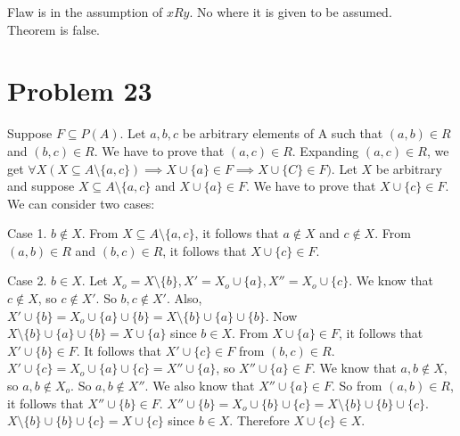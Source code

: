 \documentclass{article}
\begin{document}
Flaw is in the assumption of $xRy$. No where it is given to be
assumed. \\

Theorem is false.

\section{Problem 23}
Suppose $F \subseteq P(A)$. Let $a,b,c$ be arbitrary elements of A
such that $(a,b) \in R$ and $(b,c) \in R$. We have to prove that
$(a,c) \in R$. Expanding $(a,c) \in R$, we get $\forall X(X \subseteq
A \setminus \{a,c\}) \implies X \cup \{a\} \in F \implies X \cup \{C\}
\in F)$. Let $X$ be arbitrary and suppose $X \subseteq A \setminus
\{a,c\}$ and $X \cup \{a\} \in F$. We have to prove that $X \cup \{c\}
\in F$. We can consider two cases:

Case 1. $b \notin X$. From $X \subseteq A \setminus \{a,c\}$, it
follows that $a \notin X$ and $c \notin X$. From $(a,b) \in R$ and
$(b,c) \in R$, it follows that $X \cup \{c\} \in F$.

Case 2. $b \in X$. Let $X_o = X \setminus \{b\}, X' = X_o \cup \{a\},
X'' = X_o \cup \{c\}$. We know that $c \notin X$, so $c \notin X'$. So
$b,c \notin X'$. Also, $X' \cup \{b\} = X_o \cup \{a\} \cup \{b\} = X
\setminus \{b\} \cup \{a\} \cup \{b\}$. Now $X \setminus \{b\} \cup
\{a\} \cup \{b\} = X \cup \{a\} $ since $b \in X$. From $X \cup \{a\}
\in F$, it follows that $X' \cup \{b\} \in F$. It follows that $X'
\cup \{c\} \in F$ from $(b,c) \in R$. $X' \cup \{c\} = X_o \cup \{a\}
\cup \{c\} = X'' \cup \{a\}$, so $X'' \cup \{a\} \in F$. We know that
$a,b \notin X$, so $a,b \notin X_o$. So $a,b \notin X''$. We also know
that $X'' \cup \{a\} \in F$. So from $(a,b) \in R$, it follows that
$X'' \cup \{b\} \in F$. $X'' \cup \{b\} = X_o \cup \{b\} \cup \{c\} =
X \setminus \{b\} \cup \{b\} \cup \{c\}$. $X \setminus \{b\} \cup
\{b\} \cup \{c\} = X \cup \{c\}$ since $b \in X$. Therefore $X \cup
\{c\} \in X$.
\end{document}
